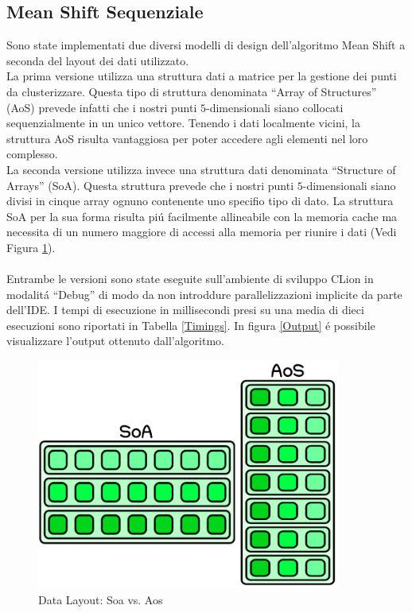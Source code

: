 \documentclass{article}
\begin{document}
\newpage

\subsection{Mean Shift Sequenziale}

Sono state implementati due diversi modelli di design dell'algoritmo Mean Shift a seconda del layout dei dati utilizzato.\\ La prima versione utilizza una struttura dati a matrice per la gestione dei punti da clusterizzare. Questa tipo di struttura denominata “Array of Structures” (AoS) prevede infatti che i nostri punti $5$-dimensionali siano collocati sequenzialmente in un unico vettore. Tenendo i dati localmente vicini, la struttura AoS risulta vantaggiosa per poter accedere agli elementi nel loro complesso.\\ La seconda versione utilizza invece una struttura dati denominata “Structure of Arrays” (SoA). Questa struttura prevede che i nostri punti $5$-dimensionali siano divisi in cinque array ognuno contenente uno specifio tipo di dato. La struttura SoA per la sua forma risulta pi\'u facilmente allineabile con la memoria cache ma necessita di un numero maggiore di accessi alla memoria per riunire i dati (Vedi Figura \ref{Data Layout}).\\
\\
Entrambe le versioni sono state eseguite sull'ambiente di sviluppo CLion in modalit\'a “Debug” di modo da non introddure parallelizzazioni implicite da parte dell'IDE. I tempi di esecuzione in millisecondi presi su una media di dieci esecuzioni sono riportati in Tabella \ref{Timings}. In figura \ref{Output} \'e possibile visualizzare l'output ottenuto dall'algoritmo.

\vspace{10px}    

\begin{figure}[!h]
\centering
\includegraphics[width= 10cm]{"Immagini/Data_Layout.PNG"}
\caption{Data Layout: Soa vs. Aos}
\label{Data Layout}
\end{figure}
\end{document}
